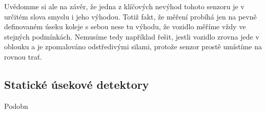 \documentclass[12pt,a4paper]{article}
\begin{document}
Uvědomme si ale na závěr, že jedna z klíčových nevýhod tohoto senzoru je v
určitém slova smyslu i jeho výhodou. Totiž fakt, že měření probíhá jen na pevně
definovaném úseku koleje s sebou nese tu výhodu, že vozidlo měříme vždy ve
stejných podmínkách. Nemusíme tedy například řešit, jestli vozidlo zrovna jede
v oblouku a je zpomalováno odstředivými silami, protože senzor prostě umístíme
na rovnou trať.

\subsection{Statické úsekové detektory}

Podobn
\end{document}
